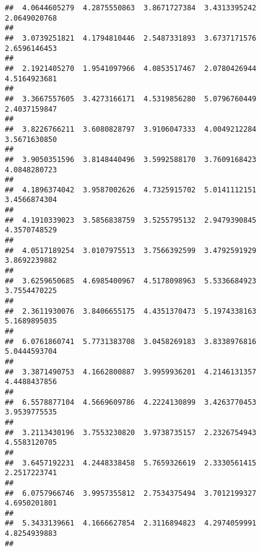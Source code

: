 \documentclass[]{article}
\begin{document}
\begin{verbatim}
##  4.0644605279  4.2875550863  3.8671727384  3.4313395242  2.0649020768 
##                                                                       
##  3.0739251821  4.1794810446  2.5487331893  3.6737171576  2.6596146453 
##                                                                       
##  2.1921405270  1.9541097966  4.0853517467  2.0780426944  4.5164923681 
##                                                                       
##  3.3667557605  3.4273166171  4.5319856280  5.0796760449  2.4037159847 
##                                                                       
##  3.8226766211  3.6080828797  3.9106047333  4.0049212284  3.5671630850 
##                                                                       
##  3.9050351596  3.8148440496  3.5992588170  3.7609168423  4.0848280723 
##                                                                       
##  4.1896374042  3.9587002626  4.7325915702  5.0141112151  3.4566874304 
##                                                                       
##  4.1910339023  3.5856838759  3.5255795132  2.9479390845  4.3570748529 
##                                                                       
##  4.0517189254  3.0107975513  3.7566392599  3.4792591929  3.8692239882 
##                                                                       
##  3.6259650685  4.6985400967  4.5178098963  5.5336684923  3.7554470225 
##                                                                       
##  2.3611930076  3.8406655175  4.4351370473  5.1974338163  5.1689895035 
##                                                                       
##  6.0761860741  5.7731383708  3.0458269183  3.8338976816  5.0444593704 
##                                                                       
##  3.3871490753  4.1662800887  3.9959936201  4.2146131357  4.4488437856 
##                                                                       
##  6.5578877104  4.5669609786  4.2224130899  3.4263770453  3.9539775535 
##                                                                       
##  3.2113430196  3.7553230820  3.9738735157  2.2326754943  4.5583120705 
##                                                                       
##  3.6457192231  4.2448338458  5.7659326619  2.3330561415  2.2517223741 
##                                                                       
##  6.0757966746  3.9957355812  2.7534375494  3.7012199327  4.6950201801 
##                                                                       
##  5.3433139661  4.1666627854  2.3116894823  4.2974059991  4.8254939883 
##                                                                       

\end{verbatim}
\end{document}
